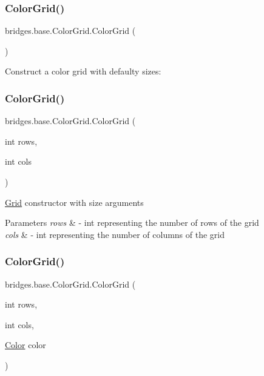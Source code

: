 \subsubsection{\texorpdfstring{Color\+Grid()}{ColorGrid()}\hspace{0.1cm}{\footnotesize\ttfamily [1/3]}}
{\footnotesize\ttfamily bridges.\+base.\+Color\+Grid.\+Color\+Grid (\begin{DoxyParamCaption}{ }\end{DoxyParamCaption})}

Construct a color grid with defaulty sizes\+: \mbox{\label{classbridges_1_1base_1_1_color_grid_aafb4157a4c8129f30c1f989fcdfda544}} 
\subsubsection{\texorpdfstring{Color\+Grid()}{ColorGrid()}\hspace{0.1cm}{\footnotesize\ttfamily [2/3]}}
{\footnotesize\ttfamily bridges.\+base.\+Color\+Grid.\+Color\+Grid (\begin{DoxyParamCaption}\item[{int}]{rows,  }\item[{int}]{cols }\end{DoxyParamCaption})}

\hyperlink{classbridges_1_1base_1_1_grid}{Grid} constructor with size arguments


\begin{DoxyParams}{Parameters}
{\em rows} & -\/ int representing the number of rows of the grid \\
\hline
{\em cols} & -\/ int representing the number of columns of the grid \\
\hline
\end{DoxyParams}
\mbox{\label{classbridges_1_1base_1_1_color_grid_aef40242c93b66ab851e6afa64cada0b5}} 
\subsubsection{\texorpdfstring{Color\+Grid()}{ColorGrid()}\hspace{0.1cm}{\footnotesize\ttfamily [3/3]}}
{\footnotesize\ttfamily bridges.\+base.\+Color\+Grid.\+Color\+Grid (\begin{DoxyParamCaption}\item[{int}]{rows,  }\item[{int}]{cols,  }\item[{\hyperlink{classbridges_1_1base_1_1_color}{Color}}]{color }\end{DoxyParamCaption})}

